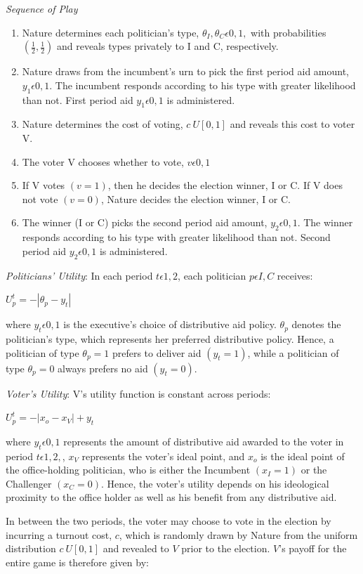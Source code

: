 \documentclass[12pt]{paper}
\begin{document}
\emph{Sequence of Play}
\begin{enumerate}
	\item Nature determines each politician’s type, $\theta_I, \theta_C \epsilon {0,1},$ with probabilities $(\frac{1}{2}, \frac{1}{2})$ and reveals types privately to I and C, respectively.
	\item Nature draws from the incumbent’s urn to pick the first period aid amount, $y_1\epsilon {0,1}.$ The incumbent responds according to his type with greater likelihood than not. First period aid $y_1\epsilon {0,1}$ is administered.
	\item Nature determines the cost of voting, $c~U[0,1]$ and reveals this cost to voter V.
	\item The voter V chooses whether to vote, $v\epsilon{0,1}$
	\item If V votes $(v=1)$, then he decides the election winner, I or C. If V does not vote $(v=0)$, Nature decides the election winner, I or C.
	\item The winner (I or C) picks the second period aid amount, $y_2\epsilon {0,1}$. The winner responds according to his type with greater likelihood than not. Second period aid  $y_2 \epsilon {0,1}$ is administered.
\end{enumerate}

\emph{Politicians' Utility}: In each period $t\epsilon{1,2}$, each politician $p\epsilon{I,C}$ receives: 

$U_{p}^t = -|\theta_p - y_t|$

where $y_t\epsilon {0,1}$ is the executive’s choice of distributive aid policy. $\theta_p$ denotes the politician’s type, which represents her preferred distributive policy. Hence, a politician of type $\theta_p=1$ prefers to deliver aid $(y_t=1)$, while a politician of type $\theta_p=0$ always prefers no aid $(y_t=0).$

\emph{Voter's Utility}: V’s utility function is constant across periods: 

$U_{p}^t = -|x_o - x_V| + y_t$

where $y_t\epsilon{0,1}$ represents the amount of distributive aid awarded to the voter in period $t\epsilon{1,2},$, $x_V$ represents the voter’s ideal point, and $x_o$ is the ideal point of the office-holding politician, who is either the Incumbent $(x_I=1)$ or the Challenger $(x_C=0).$ Hence, the voter’s utility depends on his ideological proximity to the office holder as well as his benefit from any distributive aid.

In between the two periods, the voter may choose to vote in the election by incurring a turnout cost, $c$, which is randomly drawn by Nature from the uniform distribution $c~U[0,1]$ and revealed to $V$ prior to the election. $V$’s payoff for the entire game is therefore given by:
\end{document}

